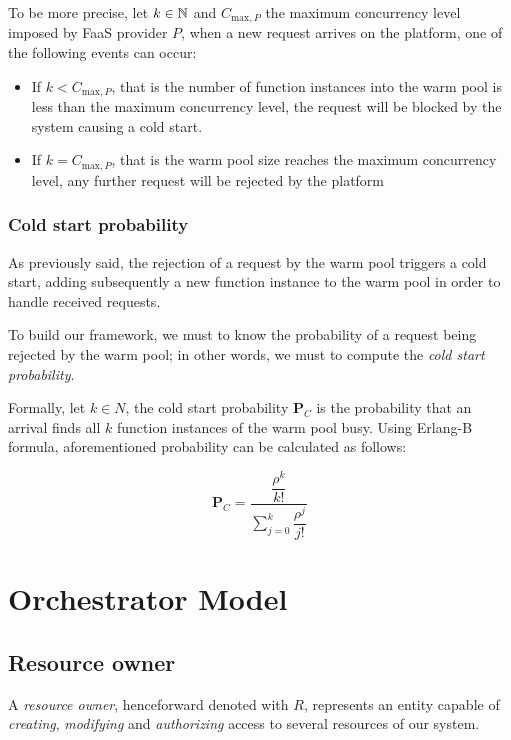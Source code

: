 To be more precise, let $k \in \mathbb{N}$ and $C_{\text{max},P}$ the maximum concurrency level imposed by FaaS provider $P$, when a new request arrives on the platform, one of the following events can occur:

\begin{itemize}
	\item If $k < C_{\text{max},P}$, that is the number of function instances into the warm pool is less than the maximum concurrency level, the request will be blocked by the system causing a cold start.
	
	\item If $k = C_{\text{max},P}$, that is the warm pool size reaches the maximum concurrency level, any further request will be rejected by the platform
\end{itemize}

\subsubsection{Cold start probability}

As previously said, the rejection of a request by the warm pool triggers a cold start, adding subsequently a new function instance to the warm pool in order to handle received requests. 

To build our framework, we must to know the probability of a request being rejected by the warm pool; in other words, we must to compute the \textit{cold start probability}. 

Formally, let $k \in N$, the cold start probability $\textbf{P}_{C}$ is the probability that an arrival finds all $k$ function instances of the warm pool busy. Using Erlang-B formula, aforementioned probability can be calculated as follows:

\begin{equation}
	\textbf{P}_{C} = \dfrac{\dfrac{\rho^k}{k!}}{\displaystyle\sum_{j=0}^k \dfrac{\rho^j}{j!}}
\end{equation}




\section{Orchestrator Model}

\subsection{Resource owner}

A \textit{resource owner}, henceforward denoted with $R$, represents an entity capable of \textit{creating}, \textit{modifying} and \textit{authorizing} access to several resources of our system.

